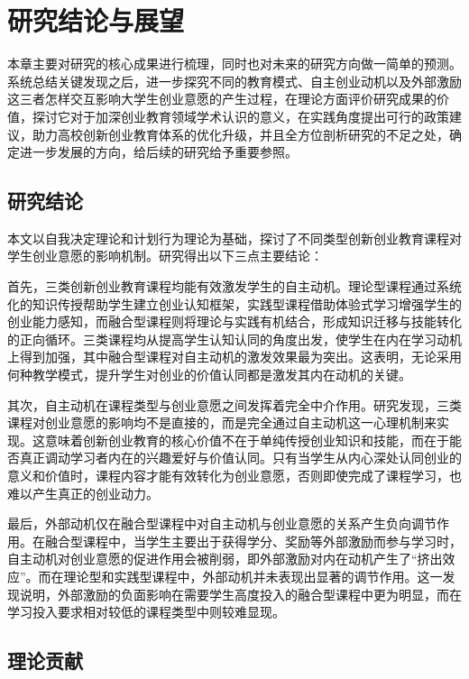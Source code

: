 \chapter{研究结论与展望}

本章主要对研究的核心成果进行梳理，同时也对未来的研究方向做一简单的预测。系统总结关键发现之后，进一步探究不同的教育模式、自主创业动机以及外部激励这三者怎样交互影响大学生创业意愿的产生过程，在理论方面评价研究成果的价值，探讨它对于加深创业教育领域学术认识的意义，在实践角度提出可行的政策建议，助力高校创新创业教育体系的优化升级，并且全方位剖析研究的不足之处，确定进一步发展的方向，给后续的研究给予重要参照。

\section{研究结论}

本文以自我决定理论和计划行为理论为基础，探讨了不同类型创新创业教育课程对学生创业意愿的影响机制。研究得出以下三点主要结论：

首先，三类创新创业教育课程均能有效激发学生的自主动机。理论型课程通过系统化的知识传授帮助学生建立创业认知框架，实践型课程借助体验式学习增强学生的创业能力感知，而融合型课程则将理论与实践有机结合，形成知识迁移与技能转化的正向循环。三类课程均从提高学生认知认同的角度出发，使学生在内在学习动机上得到加强，其中融合型课程对自主动机的激发效果最为突出。这表明，无论采用何种教学模式，提升学生对创业的价值认同都是激发其内在动机的关键。

其次，自主动机在课程类型与创业意愿之间发挥着完全中介作用。研究发现，三类课程对创业意愿的影响均不是直接的，而是完全通过自主动机这一心理机制来实现。这意味着创新创业教育的核心价值不在于单纯传授创业知识和技能，而在于能否真正调动学习者内在的兴趣爱好与价值认同。只有当学生从内心深处认同创业的意义和价值时，课程内容才能有效转化为创业意愿，否则即使完成了课程学习，也难以产生真正的创业动力。

最后，外部动机仅在融合型课程中对自主动机与创业意愿的关系产生负向调节作用。在融合型课程中，当学生主要出于获得学分、奖励等外部激励而参与学习时，自主动机对创业意愿的促进作用会被削弱，即外部激励对内在动机产生了\nolinebreak[3]“挤出效应”。而在理论型和实践型课程中，外部动机并未表现出显著的调节作用。这一发现说明，外部激励的负面影响在需要学生高度投入的融合型课程中更为明显，而在学习投入要求相对较低的课程类型中则较难显现。

\section{理论贡献}

